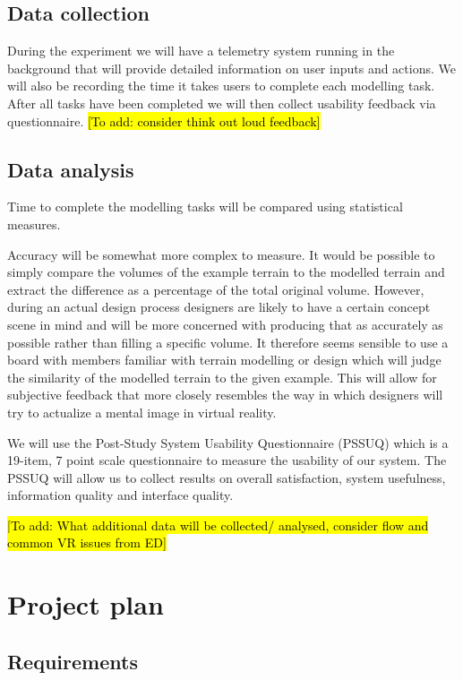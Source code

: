 \documentclass{sig-alternate-05-2015}
\begin{document}
\subsection{Data collection}
During the experiment we will have a telemetry system running in the background that will provide detailed information on user inputs and actions. We will also be recording the time it takes users to complete each modelling task. After all tasks have been completed we will then collect usability feedback via questionnaire.
\hl{[To add: consider think out loud feedback]}
\subsection{Data analysis}
Time to complete the modelling tasks will be compared using statistical measures.

Accuracy will be somewhat more complex to measure. It would be possible to simply compare the volumes of the example terrain to the modelled terrain and extract the difference as a percentage of the total original volume. However, during an actual design process designers are likely to have a certain concept scene in mind and will be more concerned with producing that as accurately as possible rather than filling a specific volume. It therefore seems sensible to use a board with members familiar with terrain modelling or design which will judge the similarity of the modelled terrain to the given example. This will allow for subjective feedback that more closely resembles the way in which designers will try to actualize a mental image in virtual reality.

We will use the Post-Study System Usability Questionnaire (PSSUQ) which is a 19-item, 7 point scale questionnaire\cite{Lewis1995} to measure the usability of our system. The PSSUQ will allow us to collect results on overall satisfaction, system usefulness, information quality and interface quality.

\hl{[To add: What additional data will be collected/ analysed, consider flow and common VR issues from ED]}

\section{Project plan}
\subsection{Requirements}
\end{document}
